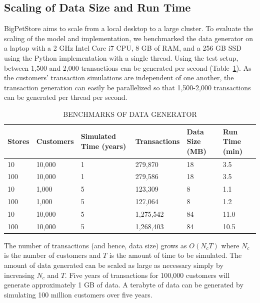 \subsection{Scaling of Data Size and Run Time}
BigPetStore aims to scale from a local desktop to a large cluster. To evaluate the scaling of the model and implementation, we benchmarked the data generator on a laptop with a 2 GHz Intel Core i7 CPU, 8 GB of RAM, and a 256 GB SSD using the Python implementation with a single thread. Using the test setup, between 1,500 and 2,000 transactions can be generated per second (Table~\ref{tab:benchmarks}). As the customers' transaction simulations are independent of one another, the transaction generation can easily be parallelized so that 1,500-2,000 transactions can be generated per thread per second.

\begin{table}[!t]
\caption{\label{tab:benchmarks} \uppercase{Benchmarks of Data Generator}}
\centering
\small
\begin{tabular}{ p{1cm} p{1.75cm} p{2cm} p{2.25cm} p{1.5cm} p{1.5cm} }
\hline
Stores & Customers & Simulated Time (years) & Transactions & Data Size (MB) & Run Time (min)\\ \hline
10 & 10,000 & 1 & 279,870 & 18 & 3.5 \\ \hline
100 & 10,000 & 1 & 279,586 & 18 & 3.5 \\ \hline
10 & 1,000 & 5 & 123,309 & 8 & 1.1 \\ \hline
100 & 1,000 & 5 & 127,064 & 8 & 1.2 \\ \hline
10 & 10,000 & 5 & 1,275,542 & 84 & 11.0 \\ \hline
100 & 10,000 & 5 & 1,268,403 & 84 & 10.5 \\ \hline
\end{tabular}
\end{table}

The number of transactions (and hence, data size) grows as $O(N_c T)$ where $N_c$ is the number of customers and $T$ is the amount of time to be simulated. The amount of data generated can be scaled as large as necessary simply by increasing $N_c$ and $T$. Five years of transactions for 100,000 customers will generate approximately 1 GB of data. A terabyte of data can be generated by simulating 100 million customers over five years. 

